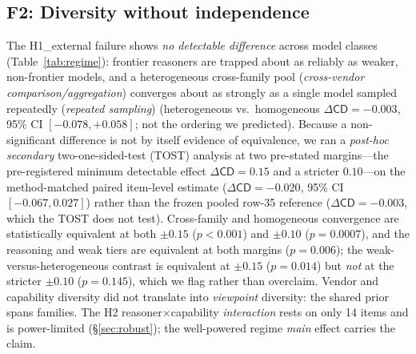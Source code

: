 \documentclass[acmsmall,screen,review,anonymous]{acmart}
\newcommand{\cd}{\textsf{CD}}
\begin{document}
\subsection{F2: Diversity without independence}
\label{sec:f2}
The H1\_external failure shows \emph{no detectable difference} across model classes (Table~\ref{tab:regime}): frontier
reasoners are trapped about as reliably as weaker, non-frontier models, and a heterogeneous cross-family pool
(\emph{cross-vendor comparison/aggregation}) converges about as strongly as a single model sampled repeatedly
(\emph{repeated sampling}) (heterogeneous vs.\ homogeneous $\Delta\cd=-0.003$, 95\% CI
$[-0.078,+0.058]$; not the ordering we predicted). Because a non-significant difference is not by itself
evidence of equivalence, we ran a \emph{post-hoc secondary} two-one-sided-test (TOST) analysis at two
pre-stated margins---the pre-registered minimum detectable effect $\Delta\cd=0.15$ and a stricter
$0.10$---on the method-matched paired item-level estimate ($\Delta\cd=-0.020$, 95\% CI $[-0.067,0.027]$)
rather than the frozen
pooled row-35 reference ($\Delta\cd=-0.003$, which the TOST does not test). Cross-family and homogeneous convergence are
statistically equivalent at both $\pm0.15$ ($p<0.001$) and $\pm0.10$ ($p=0.0007$), and the reasoning and
weak tiers are equivalent at both margins ($p=0.006$); the weak-versus-heterogeneous contrast is equivalent
at $\pm0.15$ ($p=0.014$) but \emph{not} at the stricter $\pm0.10$ ($p=0.145$), which we flag rather than
overclaim. Vendor and capability diversity did not translate into
\emph{viewpoint} diversity: the shared prior spans families. The H2 reasoner$\times$capability
\emph{interaction} rests on only 14 items and is power-limited (\S\ref{sec:robust}); the well-powered regime
\emph{main} effect carries the claim.
\end{document}
